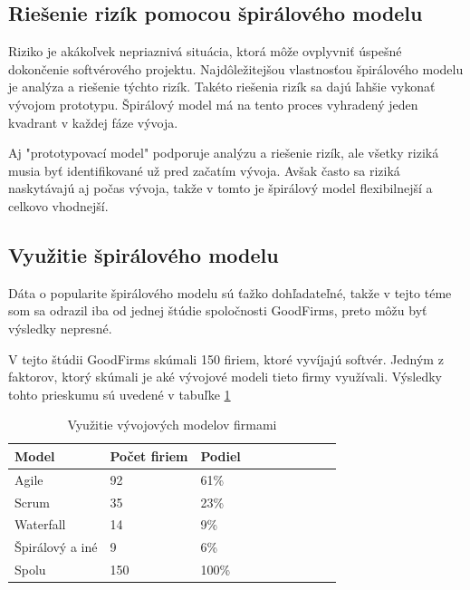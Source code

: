 \documentclass[10pt,twoside,slovak,a4paper]{article}
\begin{document}
\subsection{Riešenie rizík pomocou špirálového modelu} \label{risks:spiralModel}
Riziko je akákoľvek nepriaznivá situácia, ktorá môže ovplyvniť úspešné dokončenie softvérového projektu. Najdôležitejšou vlastnosťou špirálového modelu je analýza a riešenie týchto rizík. Takéto riešenia rizík sa dajú ľahšie vykonať vývojom prototypu. Špirálový model má na tento proces vyhradený jeden kvadrant v každej fáze vývoja.

Aj "prototypovací model" podporuje analýzu a riešenie rizík, ale všetky riziká musia byť identifikované už pred začatím vývoja. Avšak často sa riziká naskytávajú aj počas vývoja, takže v tomto je špirálový model flexibilnejší a celkovo vhodnejší. \cite{SpiralModelDef}


\subsection{Využitie špirálového modelu} \label{usage:spiralModel}
Dáta o popularite špirálového modelu sú ťažko dohľadateľné, takže v tejto téme som sa odrazil iba od jednej štúdie spoločnosti GoodFirms, preto môžu byť výsledky nepresné. 

V tejto štúdii GoodFirms skúmali 150 firiem, ktoré vyvíjajú softvér. Jedným z faktorov, ktorý skúmali je aké vývojové modeli tieto firmy využívali. Výsledky tohto prieskumu sú uvedené v tabuľke \ref{usageTab}

\begin{table}[!ht]
	\caption{Využitie vývojových modelov firmami \cite{SpiralModelUsage}}
	\label{usageTab}
    \centering
    \begin{tabular}{|l|l|l|l|l|l|l|l|l|l|}
    \hline   
    \hline
        Model           & Počet firiem & Podiel \\ \hline
    \hline
        Agile           & 92           & 61\%       \\ \hline
        Scrum           & 35           & 23\%      \\ \hline
        Waterfall       & 14           & 9\%      \\ \hline
        Špirálový a iné & 9            & 6\%      \\ \hline
    \hline
        Spolu           & 150            & 100\%     \\ \hline
    \end{tabular}
\end{table}
\end{document}
